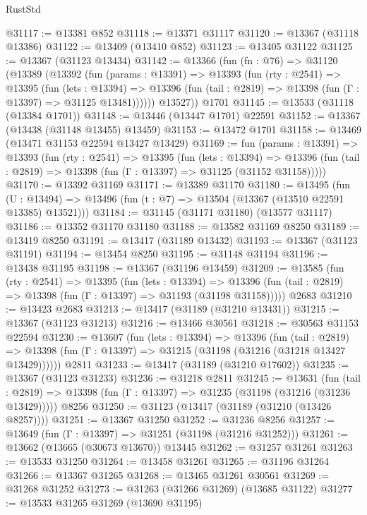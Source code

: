 \begin{lexlean}{RustStd}
\begin{coremodule}
@31117 := @13381 @852
@31118 := @13371 @31117
@31120 := @13367 (@31118 @13386)
@31122 := @13409 (@13410 @852)
@31123 := @13405 @31122
@31125 := @13367 (@31123 @13434)
@31142 := @13366
    (fun (fn : @76) =>
    @31120
      (@13389
        (@13392
          (fun (params : @13391) =>
          @13393
            (fun (rty : @2541) =>
            @13395
              (fun (lets : @13394) =>
              @13396 (fun (tail : @2819) => @13398 (fun (Γ : @13397) => @31125 @13481))))))
        @13527))
    @1701
@31145 := @13533 (@31118 (@13384 @1701))
@31148 := @13446 (@13447 @1701) @22591
@31152 := @13367 (@13438 (@31148 @13455) @13459)
@31153 := @13472 @1701
@31158 := @13469 (@13471 @31153 @22594 @13427 @13429)
@31169 := fun (params : @13391) =>
  @13393
    (fun (rty : @2541) =>
    @13395
      (fun (lets : @13394) =>
      @13396 (fun (tail : @2819) => @13398 (fun (Γ : @13397) => @31125 (@31152 @31158)))))
@31170 := @13392 @31169
@31171 := @13389 @31170
@31180 := @13495
    (fun (U : @13494) => @13496 (fun (t : @7) => @13504 (@13367 (@13510 @22591 @13385) @13521)))
@31184 := @31145 (@31171 @31180) (@13577 @31117)
@31186 := @13352 @31170 @31180
@31188 := @13582 @31169 @8250
@31189 := @13419 @8250
@31191 := @13417 (@31189 @13432)
@31193 := @13367 (@31123 @31191)
@31194 := @13454 @8250
@31195 := @31148 @31194
@31196 := @13438 @31195
@31198 := @13367 (@31196 @13459)
@31209 := @13585
    (fun (rty : @2541) =>
    @13395
      (fun (lets : @13394) =>
      @13396 (fun (tail : @2819) => @13398 (fun (Γ : @13397) => @31193 (@31198 @31158)))))
    @2683
@31210 := @13423 @2683
@31213 := @13417 (@31189 (@31210 @13431))
@31215 := @13367 (@31123 @31213)
@31216 := @13466 @30561
@31218 := @30563 @31153 @22594
@31230 := @13607
    (fun (lets : @13394) =>
    @13396
      (fun (tail : @2819) =>
      @13398 (fun (Γ : @13397) => @31215 (@31198 (@31216 (@31218 @13427 @13429))))))
    @2811
@31233 := @13417 (@31189 (@31210 @17602))
@31235 := @13367 (@31123 @31233)
@31236 := @31218 @2811
@31245 := @13631
    (fun (tail : @2819) => @13398 (fun (Γ : @13397) => @31235 (@31198 (@31216 (@31236 @13429)))))
    @8256
@31250 := @31123 (@13417 (@31189 (@31210 (@13426 @8257))))
@31251 := @13367 @31250
@31252 := @31236 @8256
@31257 := @13649 (fun (Γ : @13397) => @31251 (@31198 (@31216 @31252)))
@31261 := @13662 (@13665 (@30673 @13670)) @13445
@31262 := @31257 @31261
@31263 := @13533 @31250
@31264 := @13458 @31261
@31265 := @31196 @31264
@31266 := @13367 @31265
@31268 := @13465 @31261 @30561
@31269 := @31268 @31252
@31273 := @31263 (@31266 @31269) (@13685 @31122)
@31277 := @13533 @31265 @31269 (@13690 @31195)

\end{coremodule}
\end{lexlean}
